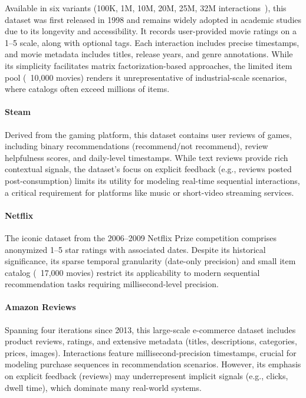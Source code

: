 \documentclass[sigconf,authorversion,nonacm]{acmart}
\begin{document}
Available in six variants (100K, 1M, 10M, 20M, 25M, 32M interactions~\cite{movielens}), this dataset was first released in 1998 and remains widely adopted in academic studies due to its longevity and accessibility.
It records user-provided movie ratings on a 1--5 scale, along with optional tags.
Each interaction includes precise timestamps, and movie metadata includes titles, release years, and genre annotations.
While its simplicity facilitates matrix factorization-based approaches, the limited item pool (~10,000 movies) renders it unrepresentative of industrial-scale scenarios, where catalogs often exceed millions of items.

\paragraph{Steam}

Derived from the gaming platform, this dataset contains user reviews of games, including binary recommendations (recommend/not recommend), review helpfulness scores, and daily-level timestamps.
While text reviews provide rich contextual signals, the dataset’s focus on explicit feedback (e.g., reviews posted post-consumption) limits its utility for modeling real-time sequential interactions, a critical requirement for platforms like music or short-video streaming services.

\paragraph{Netflix}

The iconic dataset from the 2006–2009 Netflix Prize competition comprises anonymized 1–5 star ratings with associated dates.
Despite its historical significance, its sparse temporal granularity (date-only precision) and small item catalog (~17,000 movies) restrict its applicability to modern sequential recommendation tasks requiring millisecond-level precision.

\paragraph{Amazon Reviews}

Spanning four iterations since 2013, this large-scale e-commerce dataset includes product reviews, ratings, and extensive metadata (titles, descriptions, categories, prices, images).
Interactions feature millisecond-precision timestamps, crucial for modeling purchase sequences in recommendation scenarios. However, its emphasis on explicit feedback (reviews) may underrepresent implicit signals (e.g., clicks, dwell time), which dominate many real-world systems.
\end{document}
